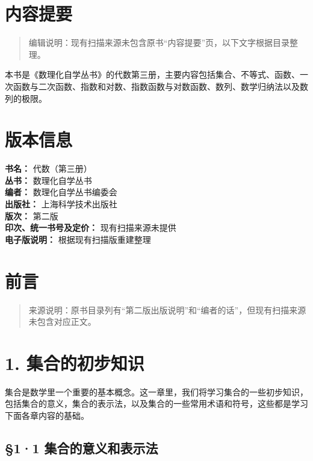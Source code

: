 \chapter*{内容提要}

\begin{quote}
编辑说明：现有扫描来源未包含原书``内容提要''页，以下文字根据目录整理。
\end{quote}

本书是《数理化自学丛书》的代数第三册，主要内容包括集合、不等式、函数、一次函数与二次函数、指数和对数、指数函数与对数函数、数列、数学归纳法以及数列的极限。

\chapter*{版本信息}

\begin{flushleft}
\textbf{书名：} 代数（第三册）\\
\textbf{丛书：} 数理化自学丛书\\
\textbf{编者：} 数理化自学丛书编委会\\
\textbf{出版社：} 上海科学技术出版社\\
\textbf{版次：} 第二版\\
\textbf{印次、统一书号及定价：} 现有扫描来源未提供\\
\textbf{电子版说明：} 根据现有扫描版重建整理
\end{flushleft}

\chapter{前言}

\begin{quote}
来源说明：原书目录列有``第二版出版说明''和``编者的话''，但现有扫描来源未包含对应正文。
\end{quote}

\chapter{1. 集合的初步知识}

集合是数学里一个重要的基本概念。这一章里，我们将学习集合的一些初步知识，包括集合的意义，集合的表示法，以及集合的一些常用术语和符号，这些都是学习下面各章内容的基础。

\section{§1·1 集合的意义和表示法}

